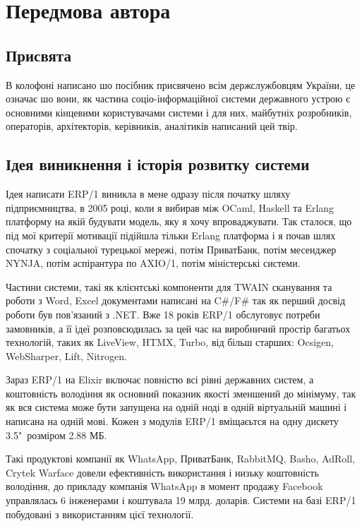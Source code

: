 \chapter*{Передмова автора}

\section*{Присвята}

В колофоні написано шо посібник присвячено всім держслужбовцям України,
це означає шо вони, як частина соціо-інформаційної системи державного устрою
є основними кінцевими користувачами системи і для них, майбутніх розробників,
операторів, архітекторів, керівників, аналітиків написаний цей твір.

\section*{Ідея виникнення і історія розвитку системи}

Ідея написати ERP/1 виникла в мене одразу після початку шляху
підприємництва, в 2005 році, коли я вибирав між OCaml, Haskell та Erlang платформу
на якій будувати модель, яку я хочу впроваджувати. Так сталося, що під мої
критерії мотивації підійшла тільки Erlang платформа і я почав шлях
спочатку з соціальної турецької мережі, потім ПриватБанк, потім месенджер NYNJA,
потім аспірантура по AXIO/1, потім міністерські системи.

Частини системи, такі як клієнтські компоненти для TWAIN сканування та роботи з Word, Excel
документами написані на C\#/F\# так як перший досвід роботи був пов'язаний з .NET.
Вже 18 років ERP/1 обслуговує потреби замовників, а її ідеї розповсюдилась за цей час
на виробничий простір багатьох технологій, таких як LiveView, HTMX, Turbo, від більш старших:
Ocsigen, WebSharper, Lift, Nitrogen.

Зараз ERP/1 на Elixir включає повністю всі рівні державних систем, а коштовність
володіння як основний показник якості зменшений до мінімуму, так як вся система
може бути запущена на одній ноді в одній віртуальній машині і написана на одній мові.
Кожен з модулів ERP/1 вміщаєьтся на одну дискету 3.5"\ розміром 2.88 МБ.

\newpage
Такі продуктові компанії як WhatsApp, ПриватБанк, RabbitMQ, Basho, AdRoll,
Crytek Warface довели ефективність використання і низьку коштовність володіння,
до прикладу компанія WhatsApp в момент продажу Facebook управлялась 6 інженерами
і коштувала 19 млрд. доларів. Системи на базі ERP/1 побудовані з використанням
цієї технології.


